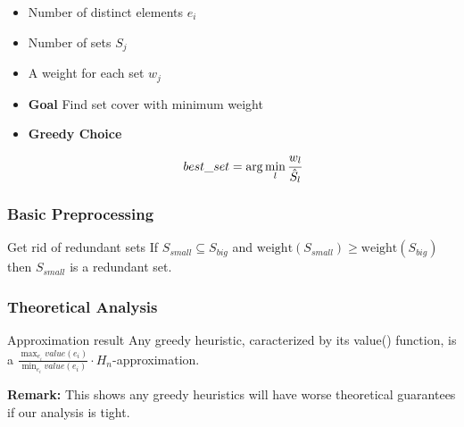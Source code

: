\documentclass[xcolor=dvipsnames]{beamer}
\newlength\myheight
\newlength\mydepth
\newcommand*\inlinegraphics[1]{%
  \settototalheight\myheight{Xygp}%
  \settodepth\mydepth{Xygp}%
  \raisebox{-\mydepth}{\texttt{[image: \#1]}}%
}
\begin{document}
\begin{frame}
\begin{minipage}{0.45\textwidth}
\begin{overlayarea}{\textwidth}{0.5\textheight}
%
\end{overlayarea}%
\end{minipage}%
\begin{minipage}{0.55\textwidth} 
\begin{itemize}
\item<1-> Number of distinct elements $e_i$
\item<2-> Number of sets $S_j$
\item<3-> A weight for each set $w_j$
\item<4-> \textbf{Goal} Find set cover with minimum weight
\item<5> \textbf{Greedy Choice} $$best\_set = \arg \min_{l} \cfrac{w_l}{\hat{S}_l}$$
\end{itemize}
\end{minipage}
\end{frame}

\begin{frame}
\frametitle{Basic Preprocessing}
\begin{block}{Get rid of redundant sets \inlinegraphics{sweep.eps}}
If $S_{small} \subseteq S_{big}$ and $\text{weight}(S_{small})\geq \text{weight}(S_{big})$ then $S_{small}$ is a redundant set.
\end{block}
\end{frame}

\begin{frame}
\frametitle{Theoretical Analysis}
\begin{block}{Approximation result}
Any greedy heuristic, caracterized by its value() function, is a $\displaystyle\frac{\displaystyle\max_{e_i} value(e_i)}{\displaystyle\min_{e_i} value(e_i)} \cdot H_n$-approximation.
\end{block}

\textbf{Remark:} This shows any greedy heuristics will have worse theoretical guarantees if our analysis is tight.
\end{frame}
\end{document}
